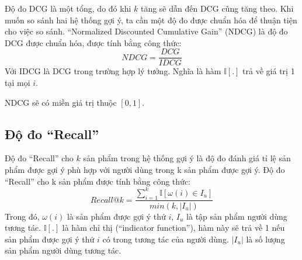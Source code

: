     Độ đo DCG là một tổng, do đó khi $k$ tăng sẽ dẫn đến DCG cũng tăng theo. Khi muốn so sánh hai hệ thống gợi ý, ta cần một độ đo được chuẩn hóa để thuận tiện cho việc so sánh. ``Normalized Discounted Cumulative Gain'' (NDCG) là độ đo DCG được chuẩn hóa, được tính bằng công thức:
    \begin{equation}
        NDCG = \frac{DCG}{IDCG}
    \end{equation}
    Với IDCG là DCG trong trường hợp lý tưởng. Nghĩa là hàm $\mathbb{I}[.]$ trả về giá trị 1 tại mọi $i$.

    NDCG sẽ có miền giá trị thuộc $[0, 1]$.

\subsection{Độ đo ``Recall''}
    Độ đo ``Recall'' cho $k$ sản phẩm trong hệ thống gợi ý là độ đo đánh giá tỉ lệ sản phẩm được gợi ý phù hợp với người dùng trong k sản phẩm được gợi ý.
    Độ đo ``Recall'' cho k sản phẩm được tính bằng công thức:
    \begin{equation}
        Recall@k = \frac{\sum_{i = 1}^k \mathbb{I}[\omega(i) \in I_u]}{min(k, |I_u|)}
    \end{equation}
    Trong đó, $\omega(i)$ là sản phẩm được gợi ý thứ $i$, $I_u$ là tập sản phẩm người dùng tương tác. $\mathbb{I}[.]$ là hàm chỉ thị (``indicator function''), hàm này sẽ trả về 1 nếu sản phẩm được gợi ý thứ $i$ có trong tương tác của người dùng. $|I_u|$ là số lượng sản phẩm người dùng tương tác.

